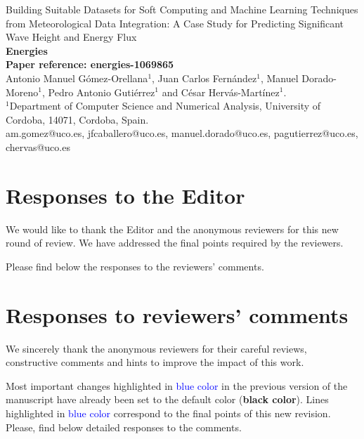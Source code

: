 \documentclass[a4paper,twoside,11pt]{article}
\makeatletter
\newcommand{\myAuthors}{Antonio Manuel Gómez-Orellana$^1$, Juan Carlos Fernández$^1$, Manuel Dorado-Moreno$^1$, Pedro Antonio Gutiérrez$^1$ and César Hervás-Martínez$^1$.}
\newcommand{\myEmail}{\Letter \quad  am.gomez@uco.es, jfcaballero@uco.es, manuel.dorado@uco.es, pagutierrez@uco.es, chervas@uco.es}
\newcommand{\myTitle}{Building Suitable Datasets for Soft Computing and Machine Learning Techniques from Meteorological Data Integration: A Case Study for Predicting Significant Wave Height and Energy Flux}
\newcommand{\myJournal}{\textbf{Energies}}
\newcommand{\myRefPaper}{\textbf{Paper reference: energies-1069865}}
\newcommand{\myDepartament}{$^1$Department of Computer Science and Numerical Analysis, University of Cordoba, 14071, Cordoba, Spain.}
\newcounter{comments}[section]
\makeatother
\begin{document}
\thispagestyle{plain}

\begin{center}
	{\LARGE\myTitle} \vspace{0.5cm} \\
	{\LARGE\myJournal} \vspace{0.5cm} \\
	{\Large\myRefPaper} \vspace{0.5cm} \\
	\myAuthors \vspace{0.5cm} \\
	{\myDepartament} \vspace{0.5cm} \\
	{\myEmail}
\end{center}

\tableofcontents

\section{Responses to the Editor}
We would like to thank the Editor and the anonymous reviewers for this new round of review. We have addressed the final points required by the reviewers. 


Please find below the responses to the reviewers' comments.

\section{Responses to reviewers' comments}
We sincerely thank the anonymous reviewers for their careful reviews, constructive comments and hints to improve the impact of this work. 

Most important changes highlighted in \textcolor{blue}{blue color} in the previous version of the manuscript have already been set to the default color (\textbf{black color}). Lines highlighted in \textcolor{blue}{blue color} correspond to the final points of this new revision. Please, find below detailed responses to the comments.

\end{document}
